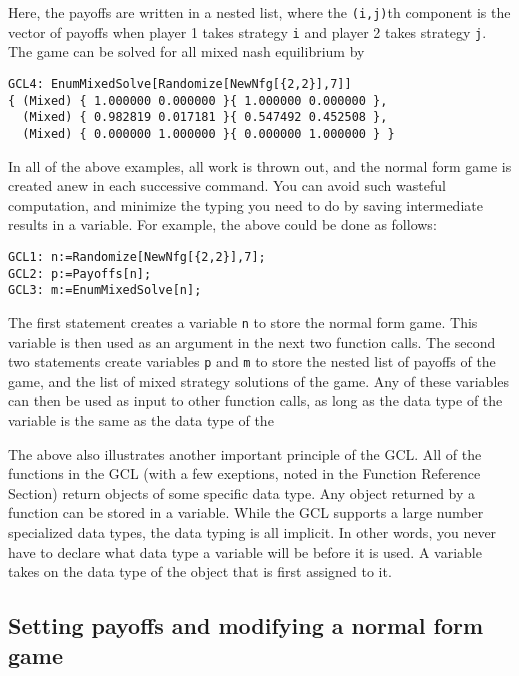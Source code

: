 \noindent
Here, the payoffs are written in a nested list, where the
\verb+(i,j)+th component is the vector of payoffs when player 1 takes
strategy \verb+i+ and player 2 takes strategy \verb+j+.  The game can
be solved for all mixed nash equilibrium by

\begin{verbatim}
GCL4: EnumMixedSolve[Randomize[NewNfg[{2,2}],7]]
{ (Mixed) { 1.000000 0.000000 }{ 1.000000 0.000000 },
  (Mixed) { 0.982819 0.017181 }{ 0.547492 0.452508 },
  (Mixed) { 0.000000 1.000000 }{ 0.000000 1.000000 } }
\end{verbatim}

In all of the above examples, all work is thrown out, and the normal
form game is created anew in each successive command.  You can avoid
such wasteful computation, and minimize the typing you need to do by
saving intermediate results in a variable.  For example, the above
could be done as follows:

\begin{verbatim}
GCL1: n:=Randomize[NewNfg[{2,2}],7];
GCL2: p:=Payoffs[n];
GCL3: m:=EnumMixedSolve[n];
\end{verbatim}

The first statement creates a variable \verb+n+ to store the normal
form game.  This variable is then used as an argument in the next two
function calls.  The second two statements create variables \verb+p+
and \verb+m+ to store the nested list of payoffs of the game, and the
list of mixed strategy solutions of the game.  Any of these variables
can then be used as input to other function calls, as long as the data
type of the variable is the same as the data type of the 

The above also illustrates another important principle of the GCL.
All of the functions in the GCL (with a few exeptions, noted in the
Function Reference Section) return objects of some specific data type.
Any object returned by a function can be stored in a variable.  While
the GCL supports a large number specialized data types, the data
typing is all implicit.  In other words, you never have to declare
what data type a variable will be before it is used.  A variable takes
on the data type of the object that is first assigned to it.    

\subsection{Setting payoffs and modifying a normal form game}  

